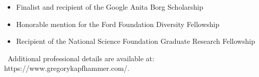 \documentclass[11pt,letterpaper,sans]{moderncv}
\newcommand{\golink}{\faLink}
\begin{document}
{\begin{itemize}
    \renewcommand\labelitemi{\Large\textbullet}
  \item Finalist and recipient of the Google Anita Borg Scholarship
  \item Honorable mention for the Ford Foundation Diversity Fellowship
  \item Recipient of the National Science Foundation Graduate Research Fellowship
\end{itemize}
\vspace*{.05in}
}



\vspace*{0.125in}
%
{\small \golink{}~Additional professional details are available at:
https://www.gregorykapfhammer.com/}.

%
%
%
%
%
%


\end{document}
